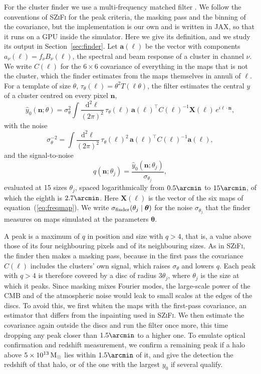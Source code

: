 For the cluster finder we use a multi-frequency matched filter \citep{Herranz2002,Melin2006}. We follow
the conventions of \textsc{SZiFi} \citep{Zubeldia2023a,Zubeldia2023} for the peak criteria, the masking
pass and the binning of the covariance, but the implementation is our own and is written in JAX, so that
it runs on a GPU inside the simulator. Here
we give its definition, and we study its output in Section~\ref{sec:finder}. Let $\bm a(\ell)$ be the
vector with components $a_\nu(\ell)=f_\nu B_\nu(\ell)$, the spectral and beam response of a cluster in
channel $\nu$. We write $C(\ell)$ for the $6\times6$ covariance of everything in the maps that is not the
cluster, which the finder estimates from the maps themselves in annuli of $\ell$. For a template of size $\theta$,
$\tau_\theta(\ell)=\theta^2T(\ell\theta)$, the filter estimates the central $y$ of a cluster centred on
every pixel $\bm n$,
\begin{equation}
\hat y_0(\bm n;\theta) = \sigma_\theta^2\int\frac{\mathrm{d}^2\ell}{(2\pi)^2}\,
\tau_\theta(\ell)\,\bm a(\ell)^{\!\top}C(\ell)^{-1}\bm X(\bm\ell)\,e^{i\bm\ell\cdot\bm n},
\label{eq:mmf}
\end{equation}
with the noise
\begin{equation}
\sigma_\theta^{-2} = \int\frac{\mathrm{d}^2\ell}{(2\pi)^2}\,
\tau_\theta(\ell)^2\,\bm a(\ell)^{\!\top}C(\ell)^{-1}\bm a(\ell),
\label{eq:sigtheta}
\end{equation}
and the signal-to-noise
\begin{equation}
q(\bm n;\theta_j) = \frac{\hat y_0(\bm n;\theta_j)}{\sigma_{\theta_j}},
\label{eq:q}
\end{equation}
evaluated at 15 sizes $\theta_j$, spaced logarithmically from $0.5\arcmin$ to $15\arcmin$, of which the
eighth is $2.7\arcmin$. Here $\bm X(\bm\ell)$ is the vector of the six maps of
equation~(\ref{eq:freqmap}). We write $\sigma_\mathrm{finder}(\theta_j\mid\bm\theta)$ for the noise $\sigma_{\theta_j}$
that the finder measures on maps simulated at the parameters $\bm\theta$.

A peak is a maximum of $q$ in position and size with $q>4$, that is, a value above those of its four
neighbouring pixels and of its neighbouring sizes. As in \textsc{SZiFi}, the finder then makes a masking
pass, because in the first pass the covariance $C(\ell)$ includes the clusters' own signal, which raises
$\sigma_\theta$ and lowers $q$. Each peak with $q>4$ is therefore covered by a disc of radius $3\theta_j$,
where $\theta_j$ is the size at which it peaks. Since masking mixes Fourier modes, the large-scale power of
the CMB and of the atmospheric noise would leak to small scales at the edges of the discs. To avoid this, we first whiten the maps with the first-pass covariance, an
estimator that differs from the inpainting used in \textsc{SZiFi}. We then estimate the covariance again
outside the discs and run the filter once more, this time dropping any peak closer than $1.5\arcmin$ to a
higher one. To emulate optical confirmation and redshift measurement, we confirm a remaining peak if a halo
above $5\times10^{13}\,\mathrm{M}_\odot$ lies within $1.5\arcmin$ of it, and give the detection the redshift of that
halo, or of the one with the largest $y_0$ if several qualify.

